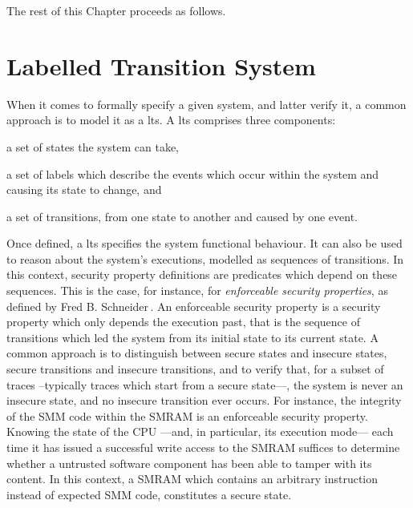 The rest of this Chapter proceeds as follows.
%

\section{Labelled Transition System} %
\label{sec:usecase:lts}

When it comes to formally specify a given system, and latter verify it, a common
approach is to model it as a \ac{lts}.
%
A \ac{lts} comprises three components:
%
\begin{inparaenum}[(1)]
%
\item a set of states the system can take,
%
\item a set of labels which describe the events which occur within the system
  and causing its state to change, and
%
\item a set of transitions, from one state to another and caused by one event.
%
\end{inparaenum}

Once defined, a \ac{lts} specifies the system functional behaviour.
%
It can also be used to reason about the system's executions, modelled as
sequences of transitions.
%
In this context, security property definitions are predicates which depend on
these sequences.
%
This is the case, for instance, for \emph{enforceable security properties}, as
defined by Fred B. Schneider\,\cite{schneider2000enforceable}.
%
An enforceable security property is a security property which only depends the
execution past, that is the sequence of transitions which led the system from
its initial state to its current state.
%
A common approach is to distinguish between secure states and insecure states,
secure transitions and insecure transitions, and to verify that, for a subset of
traces --typically traces which start from a secure state---, the system is
never an insecure state, and no insecure transition ever occurs.
%
For instance, the integrity of the SMM code within the SMRAM is an enforceable
security property.
%
Knowing the state of the CPU ---and, in particular, its execution mode--- each
time it has issued a successful write access to the SMRAM suffices to determine
whether a untrusted software component has been able to tamper with its content.
%
In this context, a SMRAM which contains an arbitrary instruction instead of
expected SMM code, constitutes a secure state.


